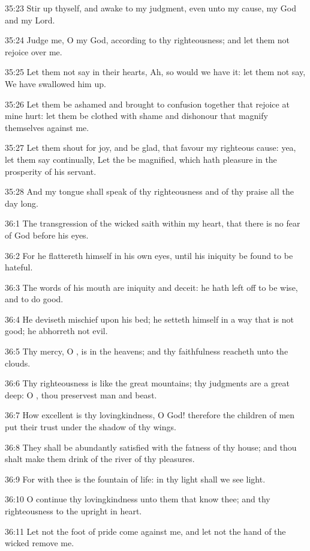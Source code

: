 35:23 Stir up thyself, and awake to my judgment, even unto my cause, my God and my Lord.

35:24 Judge me, O \LORD my God, according to thy righteousness; and let them not rejoice over me.

35:25 Let them not say in their hearts, Ah, so would we have it: let them not say, We have swallowed him up.

35:26 Let them be ashamed and brought to confusion together that rejoice at mine hurt: let them be clothed with shame and dishonour that magnify themselves against me.

35:27 Let them shout for joy, and be glad, that favour my righteous cause: yea, let them say continually, Let the \LORD be magnified, which hath pleasure in the prosperity of his servant.

35:28 And my tongue shall speak of thy righteousness and of thy praise all the day long.



36:1 The transgression of the wicked saith within my heart, that there is no fear of God before his eyes.

36:2 For he flattereth himself in his own eyes, until his iniquity be found to be hateful.

36:3 The words of his mouth are iniquity and deceit: he hath left off to be wise, and to do good.

36:4 He deviseth mischief upon his bed; he setteth himself in a way that is not good; he abhorreth not evil.

36:5 Thy mercy, O \LORD, is in the heavens; and thy faithfulness reacheth unto the clouds.

36:6 Thy righteousness is like the great mountains; thy judgments are a great deep: O \LORD, thou preservest man and beast.

36:7 How excellent is thy lovingkindness, O God! therefore the children of men put their trust under the shadow of thy wings.

36:8 They shall be abundantly satisfied with the fatness of thy house; and thou shalt make them drink of the river of thy pleasures.

36:9 For with thee is the fountain of life: in thy light shall we see light.

36:10 O continue thy lovingkindness unto them that know thee; and thy righteousness to the upright in heart.

36:11 Let not the foot of pride come against me, and let not the hand of the wicked remove me.

